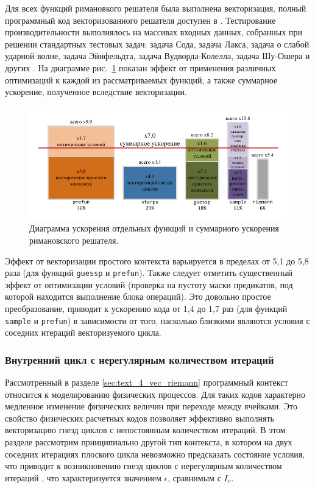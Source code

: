 Для всех функций римановкого решателя была выполнена векторизация, полный программный код векторизованного решателя доступен в \cite{riemannvecGithub}.
Тестирование производительности выполнялось на массивах входных данных, собранных при решении стандартных тестовых задач: задача Сода, задача Лакса, задача о слабой ударной волне, задача Эйнфельдта, задача Вудворда-Колелла, задача Шу-Ошера и других \cite{Bulat2015VecRiemann}.
На диаграмме рис.~\ref{fig:text_4_vec_riemann_perf} показан эффект от применения различных оптимизаций к каждой из рассматриваемых функций, а также суммарное ускорение, полученное вследствие векторизации.

\begin{figure}
\centering
\includegraphics[width=1.0\textwidth]{fig/vec_riemann_perf.pdf}
\singlespacing
{}\caption{Диаграмма ускорения отдельных функций и суммарного ускорения римановского решателя.}
\label{fig:text_4_vec_riemann_perf}
\end{figure}

Эффект от векторизации простого контекста варьируется в пределах от 5,1 до 5,8 раза (для функций \texttt{guessp} и \texttt{prefun}).
Также следует отметить существенный эффект от оптимизации условий (проверка на пустоту маски предикатов, под которой находится выполнение блока операций).
Это довольно простое преобразование, приводит к ускорению кода от 1,4 до 1,7 раз (для функций \texttt{sample} и \texttt{prefun}) в зависимости от того, насколько близкими являются условия с соседних итераций векторизуемого цикла.

\subsubsection{Внутренний цикл с нерегулярным количеством итераций}\label{sec:text_4_vec_irreg}

Рассмотренный в разделе \ref{sec:text_4_vec_riemann} программный контекст относится к моделированию физических процессов.
Для таких кодов характерно медленное изменение физических величин при переходе между ячейками.
Это свойство физических расчетных кодов позволяет эффективно выполнять векторизацию гнезд циклов с непостоянным количеством итераций.
В этом разделе рассмотрим принципиально другой тип контекста, в котором на двух соседних итерациях плоского цикла невозможно предсказать состояние условия, что приводит к возникновению гнезд циклов с нерегулярным количеством итераций \cite{Rybakov2019VecIrr,Shabanov2019VecSci}, что характеризуется значением $\epsilon$, сравнимым с $I_v$.

